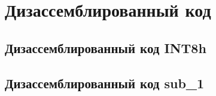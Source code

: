 \section{Дизассемблированный код}
\subsection{Дизассемблированный код INT8h} 




\subsection{Дизассемблированный код sub\_1} 

